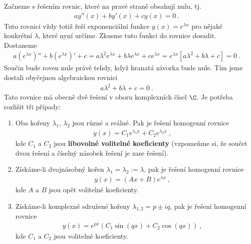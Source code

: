 Začneme s řešením rovnic, které na pravé straně obsahují nulu, tj. \begin{align}
    a y''(x) + b y'(x) + c y(x) = 0 \:.
\end{align}
Tuto rovnici vždy totiž řeší exponenciální funkce $y(x) = e^{\lambda x}$ pro nějaké konkrétní $\lambda$, které nyní určíme. Zkusme tuto funkci do rovnice dosadit. Dostaneme
\begin{align}
    a (e^{\lambda x})'' + b (e^{\lambda x})' + c = a \lambda^2  e^{\lambda x} + b \lambda e^{\lambda x} + c e^{\lambda x} = e^{\lambda x} [a \lambda^2 + b \lambda + c ] = 0 \:.
\end{align}
Součin bude roven nule právě tehdy, když hranatá závorka bude nule. Tím jsme dostali obyčejnou algebraickou rovnici \begin{align}
    a \lambda^2 + b \lambda + c = 0 \:.
\end{align}
Tato rovnice má obecně dvě řešení v oboru komplexních čísel $\C$. Je potřeba rozlišit tři případy:
\begin{enumerate}
    \item Oba kořeny $\lambda_1$, $\lambda_2$ jsou různé a reálné. Pak je řešení homogenní rovnice \begin{align}
        y(x) = C_1 e^{\lambda_1 x} + C_2 e^{\lambda_2 x} \:,
    \end{align}
    kde $C_1$ a $C_2$ jsou \textbf{libovolné volitelné koeficienty} (vzpomeňme si, že součet dvou řešení a číselný násobek řešení je zase řešení).

    \item Získáme-li dvojnásobný kořen $\lambda_1 = \lambda_2 := \lambda $, pak je řešení homogenní rovnice \begin{align}
        y(x) = (Ax + B) e^{\lambda x } \:,
    \end{align}
    kde $A$ a $B$ jsou opět volitelné koeficienty.

    \item Získáme-li komplexně sdružené kořeny $\lambda_{1,2} = p \pm i q$, pak je řešení homogenní rovnice \begin{align}
        y(x) = e^{px} \left( C_1 \sin (q x) + C_2 \cos(qx) \right) \:,
    \end{align}
    kde $C_1$ a $C_2$ jsou volitelné koeficienty.
\end{enumerate}

